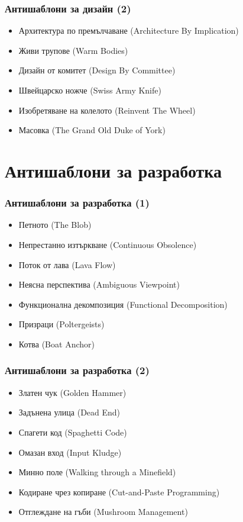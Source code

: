 \documentclass[alsotrans]{beamerswitch}
\begin{document}
\begin{frame}
  \frametitle{Антишаблони за дизайн (2)}

  \begin{itemize}[<+->]
  \item Архитектура по премълчаване (Architecture By Implication)
  \item Живи трупове (Warm Bodies)
  \item Дизайн от комитет (Design By Committee)
  \item Швейцарско ножче (Swiss Army Knife)
  \item Изобретяване на колелото (Reinvent The Wheel)
  \item Масовка (The Grand Old Duke of York)
  \end{itemize}
\end{frame}

\section{Антишаблони за разработка}

\begin{frame}
  \frametitle{Антишаблони за разработка (1)}

  \begin{itemize}[<+->]
  \item Петното (The Blob)
  \item Непрестанно изтъркване (Continuous Obsolence)
  \item Поток от лава (Lava Flow)
  \item Неясна перспектива (Ambiguous Viewpoint)
  \item Функционална декомпозиция (Functional Decomposition)
  \item Призраци (Poltergeists)
  \item Котва (Boat Anchor)
  \end{itemize}
\end{frame}

\begin{frame}
  \frametitle{Антишаблони за разработка (2)}

  \begin{itemize}[<+->]
  \item Златен чук (Golden Hammer)
  \item Задънена улица (Dead End)
  \item Спагети код (Spaghetti Code)
  \item Омазан вход (Input Kludge)
  \item Минно поле (Walking through a Minefield)
  \item Кодиране чрез копиране (Cut-and-Paste Programming)
  \item Отглеждане на гъби (Mushroom Management)
  \end{itemize}
\end{frame}
\end{document}
